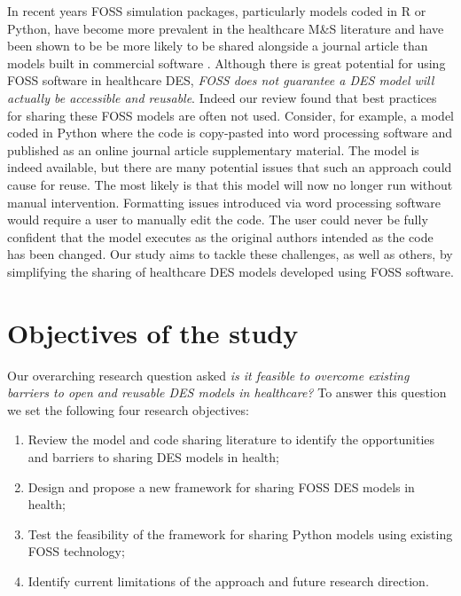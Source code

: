 \documentclass[]{interact}
\theoremstyle{plain}%
\theoremstyle{definition}
\theoremstyle{remark}
\begin{document}
 


In recent years FOSS simulation packages, particularly models coded in R or Python, have become more prevalent in the healthcare M\&S literature and have been shown to be be more likely to be shared alongside a journal article than models built in commercial software \citep{monks2023computer}. Although there is great potential for using FOSS software in healthcare DES, \textit{FOSS does not guarantee a DES model will actually be accessible and reusable}. Indeed our review found that best practices for sharing these FOSS models are often not used. Consider, for example, a model coded in Python where the code is copy-pasted into word processing software and published as an online journal article supplementary material. The model is indeed available, but there are many potential issues that such an approach could cause for reuse. The most likely is that this model will now no longer run without manual intervention. Formatting issues introduced via word processing software would require a user to manually edit the code. The user could never be fully confident that the model executes as the original authors intended as the code has been changed. Our study aims to tackle these challenges, as well as others, by simplifying the sharing of healthcare DES models developed using FOSS software.






\section{Objectives of the study}

Our overarching research question asked \textit{is it feasible to overcome existing barriers to open and reusable DES models in healthcare?}  To answer this question we set the following four research objectives:
 
\label{sec:aims}
\begin{enumerate}
    \item Review the model and code sharing literature to identify the opportunities and barriers to sharing DES models in health;
    \item Design and propose a new framework for sharing FOSS DES models in health;
    \item Test the feasibility of the framework for sharing Python models using existing FOSS technology;
    \item Identify current limitations of the approach and future research direction.  
\end{enumerate}
\end{document}
